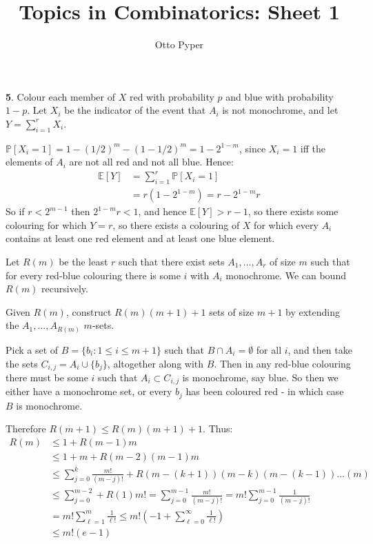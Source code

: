 \documentclass[]{article}
\title{Topics in Combinatorics: Sheet 1}
\author{Otto Pyper}
\date{}
\theoremstyle{custhm}
\theoremstyle{cusdef}
\theoremstyle{custhm}
\theoremstyle{custhm}
\theoremstyle{custhm}
\theoremstyle{custhm}
\theoremstyle{cusdef}
\theoremstyle{remark}
\newcommand{\E}{\mathbb{E}}
\renewcommand{\P}{\mathbb{P}}
\begin{document}
\maketitle
\clearpage

\textbf{5}. Colour each member of $X$ red with probability $p$ and blue with probability $1-p$. Let $X_i$ be the indicator of the event that $A_i$ is not monochrome, and let $Y = \sum_{i=1}^{r}X_i$.

$\P[X_i = 1] = 1 - (1/2)^m - (1-1/2)^m = 1 - 2^{1-m}$, since $X_i = 1$ iff the elements of $A_i$ are not all red and not all blue. Hence:
\begin{align*}
\E[Y] &= \sum_{i=1}^{r} \P[X_i = 1]\\
&= r(1-2^{1-m}) = r - 2^{1-m}r
\end{align*}
So if $r < 2^{m-1}$ then $2^{1-m}r < 1$, and hence $\E[Y] > r -1$, so there exists some colouring for which $Y = r$, so there exists a colouring of $X$ for which every $A_i$ contains at least one red element and at least one blue element.

Let $R(m)$ be the least $r$ such that there exist sets $A_1,\dots,A_r$ of size $m$ such that for every red-blue colouring there is some $i$ with $A_i$ monochrome. We can bound $R(m)$ recursively.

Given $R(m)$, construct $R(m)(m+1)+1$ sets of size $m+1$ by extending the $A_1,\dots,A_{R(m)}$ $m$-sets.

Pick a set of $B = \{b_i:1\le i\le m+1\}$ such that $B\cap A_i = \emptyset$ for all $i$, and then take the sets $C_{i,j} = A_i\cup\{b_j\}$, altogether along with $B$. Then in any red-blue colouring there must be some $i$ such that $A_i\subset C_{i,j}$ is monochrome, say blue. So then we either have a monochrome set, or every $b_j$ has been coloured red - in which case $B$ is monochrome.

Therefore $R(m+1)\le R(m)(m+1)+1$. Thus:
\begin{align*}
R(m) &\le 1 + R(m-1)m\\
&\le 1 + m + R(m-2)(m-1)m\\
&\le \sum_{j=0}^{k}\frac{m!}{(m-j)!}+R(m-(k+1))(m-k)(m-(k-1))\dots(m)\\
&\le \sum_{j=0}^{m-2} + R(1)m!= \sum_{j=0}^{m-1}\frac{m!}{(m-j)!} =m!\sum_{j = 0}^{m-1}\frac{1}{(m-j)!}\\
&=m!\sum_{\ell = 1}^{m}\frac{1}{\ell!} \le m!(-1 + \sum_{\ell = 0}^{\infty}\frac{1}{\ell!})\\
&\le m!(e-1)
\end{align*}
\end{document}
